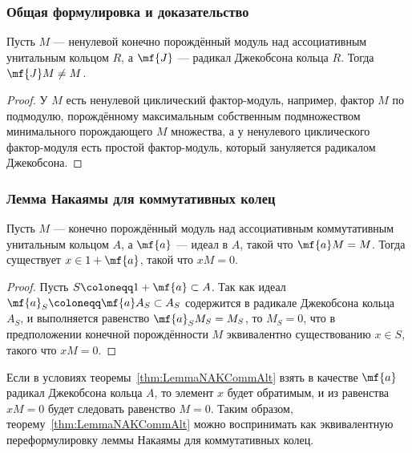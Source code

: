 \documentclass[
	extrafontsizes,
	11pt,
	hyphens,
]{memoir}
\begin{document}
\subsubsection{Общая формулировка и доказательство}

\begin{theorem}
\label{thm:LemmaNAK}
Пусть \(M\) --- ненулевой конечно порождённый модуль над ассоциативным унитальным кольцом \(R\), а \(\mf{J}\) --- радикал Джекобсона кольца \(R\). Тогда \(\mf{J}M \neq M\).
\end{theorem}

\begin{proof}
У \(M\) есть ненулевой циклический фактор-модуль,
например, фактор \(M\) по подмодулю, порождённому максимальным собственным подмножеством минимального порождающего \(M\) множества,
а у ненулевого циклического фактор-модуля есть простой фак\-тор-мо\-дуль, который зануляется радикалом Джекобсона.
\end{proof}

\subsubsection{Лемма Накаямы для коммутативных колец}

\begin{theorem}
\label{thm:LemmaNAKCommAlt}
Пусть \(M\) --- конечно порождённый модуль над ассоциативным коммутативным унитальным кольцом \(A\), а \(\mf{a}\) --- идеал в \(A\), такой что \(\mf{a}M = M\).
Тогда существует \(x \in 1 + \mf{a}\), такой что \(xM = 0\).
\end{theorem}

\begin{proof}
Пусть \(S \coloneqq 1 + \mf{a} \subset A\).
Так как идеал \(\mf{a}_S \coloneqq \mf{a} A_S \subset A_S\) содержится в радикале Джекобсона кольца \(A_S\), и выполняется равенство \(\mf{a}_S M_S = M_S\), то \(M_S = 0\),
что в предположении конечной порождённости \(M\) эквивалентно существованию \(x \in S\), такого что \(xM = 0\).
\end{proof}

\begin{remark}
Если в условиях теоремы~\ref{thm:LemmaNAKCommAlt} взять в качестве \(\mf{a}\) радикал Джекобсона кольца \(A\), то элемент \(x\) будет обратимым, и из равенства \(xM = 0\) будет следовать равенство \(M = 0\). Таким образом, теорему~\ref{thm:LemmaNAKCommAlt} можно воспринимать как эквивалентную переформулировку леммы Накаямы для коммутативных колец.
\end{remark}
\end{document}
